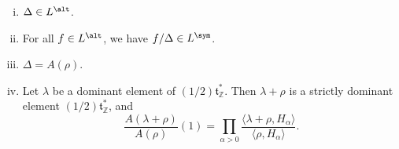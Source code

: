 \documentclass[reqno]{amsart} 
\begin{document}
\begin{lemma}\label{lem:props-of-delta-vs-L}
  \begin{enumerate}
[(i)]
  \item $\Delta \in L^{\alt}$.
  \item For all $f \in L^{\alt}$, we have $f/\Delta \in L^{\sym}$.
  \item $\Delta = A(\rho)$.
  \item Let $\lambda$ be a dominant element of $(1/2) \mathfrak{t}_{\mathbb{Z}}^*$.  Then $\lambda + \rho$ is a strictly dominant element $(1/2) \mathfrak{t}_{\mathbb{Z}}^*$, and
    \begin{equation}\label{eq:evaluate-schur-poly-at-1-general-group}
      \frac{A(\lambda+\rho)}{A(\rho)}(1)
      = \prod _{\alpha > 0}
      \frac{\langle \lambda + \rho, H_\alpha  \rangle
      }{
        \langle \rho, H_\alpha  \rangle}.
    \end{equation}
  \end{enumerate}
\end{lemma}
\end{document}
